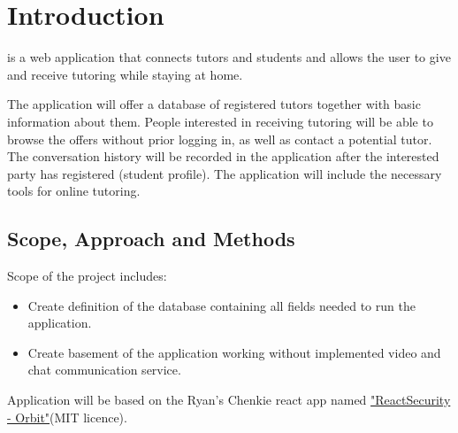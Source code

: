 \section{Introduction}


 is a web application that connects tutors and students and allows the user to give and receive tutoring while staying at home.



The application will offer a database of registered tutors together with basic information about them. People interested in receiving tutoring will be able to browse the offers without prior logging in, as well as contact a potential tutor. The conversation history will be recorded in the application after the interested party has registered (student profile). The application will include the necessary tools for online tutoring. 


\subsection{Scope, Approach and Methods}
Scope of the project includes:
\begin{itemize}
    \item Create definition of the database containing all fields needed to run the application.
    \item Create basement of the application working without implemented video and chat communication service.
\end{itemize}

Application will be based on the Ryan's Chenkie react app named \href{https://github.com/chenkie/orbit}{"ReactSecurity - Orbit"}(MIT licence).

